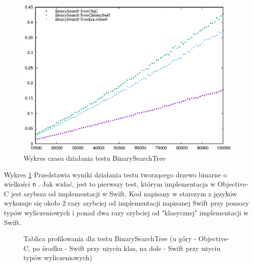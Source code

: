 \documentclass[mgr, shortabstract]{iithesis}
\newcommand{\swiftinline}[1]{
    \texttt{#1}
}
\begin{document}
\begin{figure}
    \includegraphics{plots/BinarySearchTree.eps}
    \caption{Wykres czasu działania testu BinarySearchTree}
    \label{p:binary_search}
\end{figure}

Wykres \ref{p:binary_search} Przedstawia wyniki działania testu tworzącego drzewo binarne o wielkości \swiftinline{n}. Jak widać, jest to pierwszy test, którym implementacja w Objective-C jest szybsza od implementacji w Swift. Kod napisany w starszym z języków wykonuje się około 2 razy szybciej od implementacji napisanej Swift przy pomocy typów wyliczeniowych i ponad dwa razy szybciej od "klasycznej" implementacji w Swift. 

\begin{figure}
    \caption{Tablica profilowania dla testu BinarySearchTree (u góry - Objective-C, po środku - Swift przy użyciu klas, na dole - Swift przy użyciu typów wyliczeniowych)}
    \label{i:binary_search}
\end{figure}
\end{document}
